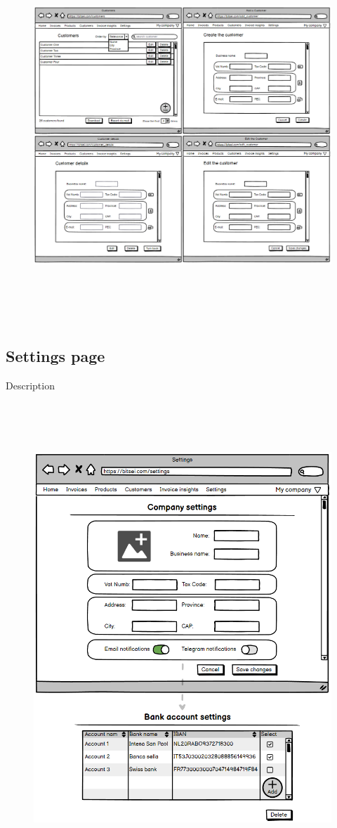 \begin{figure}[h!]
    \centering
    \includegraphics[height=400pt, keepaspectratio]{resources/mockup/Customer.png}
\end{figure}
\newpage
\subsection{Settings page}

Description

\begin{figure}[h!]
    \centering
    \includegraphics[height=500pt, keepaspectratio]{resources/mockup/Settings.png}
\end{figure}